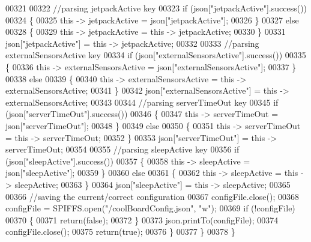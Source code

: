 \begin{DoxyCode}
00321             
00322             \textcolor{comment}{//parsing jetpackActive key}
00323             \textcolor{keywordflow}{if} (json[\textcolor{stringliteral}{"jetpackActive"}].success())
00324             \{
00325                 \textcolor{keyword}{this} -> jetpackActive = json[\textcolor{stringliteral}{"jetpackActive"}];
00326             \}
00327             \textcolor{keywordflow}{else}
00328             \{
00329                 \textcolor{keyword}{this} -> jetpackActive = \textcolor{keyword}{this} -> jetpackActive;
00330             \}
00331             json[\textcolor{stringliteral}{"jetpackActive"}] = \textcolor{keyword}{this} -> jetpackActive;
00332 
00333             \textcolor{comment}{//parsing externalSensorsActive key}
00334             \textcolor{keywordflow}{if} (json[\textcolor{stringliteral}{"externalSensorsActive"}].success())
00335             \{
00336                 \textcolor{keyword}{this} -> externalSensorsActive = json[\textcolor{stringliteral}{"externalSensorsActive"}];
00337             \}
00338             \textcolor{keywordflow}{else}
00339             \{
00340                 \textcolor{keyword}{this} -> externalSensorsActive = \textcolor{keyword}{this} -> externalSensorsActive;
00341             \}
00342             json[\textcolor{stringliteral}{"externalSensorsActive"}] = \textcolor{keyword}{this} -> externalSensorsActive;
00343 
00344             \textcolor{comment}{//parsing serverTimeOut key}
00345             \textcolor{keywordflow}{if} (json[\textcolor{stringliteral}{"serverTimeOut"}].success())
00346             \{
00347                 \textcolor{keyword}{this} -> serverTimeOut = json[\textcolor{stringliteral}{"serverTimeOut"}];
00348             \}
00349             \textcolor{keywordflow}{else}
00350             \{
00351                 \textcolor{keyword}{this} -> serverTimeOut = \textcolor{keyword}{this} -> serverTimeOut;
00352             \}
00353             json[\textcolor{stringliteral}{"serverTimeOut"}] = \textcolor{keyword}{this} -> serverTimeOut;
00354             
00355             \textcolor{comment}{//parsing sleepActive key}
00356             \textcolor{keywordflow}{if} (json[\textcolor{stringliteral}{"sleepActive"}].success())
00357             \{
00358                 \textcolor{keyword}{this} -> sleepActive = json[\textcolor{stringliteral}{"sleepActive"}];
00359             \}
00360             \textcolor{keywordflow}{else}
00361             \{
00362                 \textcolor{keyword}{this} -> sleepActive = \textcolor{keyword}{this} -> sleepActive;
00363             \}
00364             json[\textcolor{stringliteral}{"sleepActive"}] = \textcolor{keyword}{this} -> sleepActive;
00365 
00366             \textcolor{comment}{//saving the current/correct configuration}
00367             configFile.close();
00368             configFile = SPIFFS.open(\textcolor{stringliteral}{"/coolBoardConfig.json"}, \textcolor{stringliteral}{"w"});
00369             \textcolor{keywordflow}{if} (!configFile)
00370             \{
00371                 \textcolor{keywordflow}{return}(\textcolor{keyword}{false});
00372             \}
00373             json.printTo(configFile);
00374             configFile.close();
00375             \textcolor{keywordflow}{return}(\textcolor{keyword}{true});
00376         \}
00377     \}
00378 \}
\end{DoxyCode}
